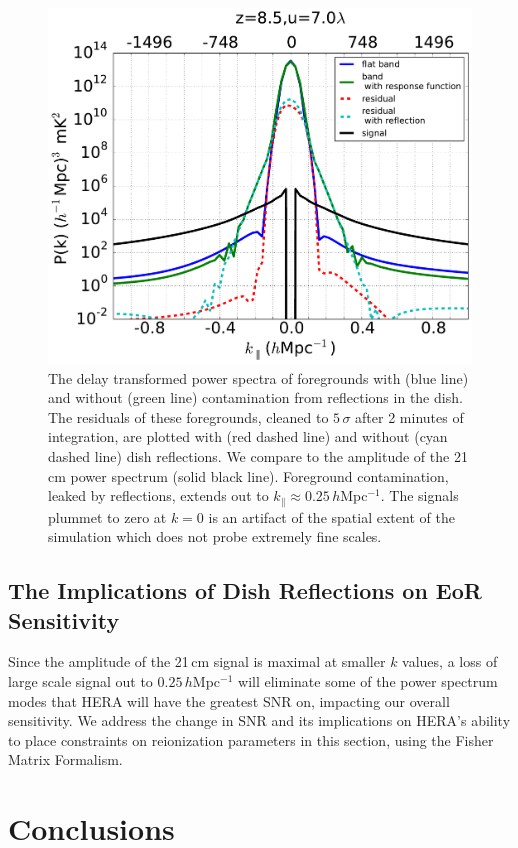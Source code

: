 \documentclass[twocolumn]{emulateapj}
\begin{document}
\begin{figure}
\centering
\includegraphics[width=.5\textwidth]{figures/resid_5sigma_compare.pdf}
\caption{The delay transformed power spectra of foregrounds with (blue line) and without (green line) contamination from reflections in the dish. The residuals of these foregrounds, cleaned to $5\,\sigma$ after 2 minutes of integration, are plotted with (red dashed line) and without (cyan dashed line) dish reflections. We compare to the amplitude of the 21\,cm power spectrum (solid black line). Foreground contamination, leaked by reflections, extends out to $k_\parallel \approx 0.25$\,$h$Mpc$^{-1}$. The signals plummet to zero at $k=0$ is an artifact of the spatial extent of the simulation which does not probe extremely fine scales.}
\label{fig:SignalCompare}
\end{figure}

\subsection{The Implications of Dish Reflections on EoR Sensitivity}
Since the amplitude of the 21\,cm signal is maximal at smaller $k$ values, a loss of large scale signal out to $0.25$\,$h$Mpc$^{-1}$ will eliminate some of the power spectrum modes that HERA will have the greatest SNR on, impacting our overall sensitivity. We address the change in SNR and its implications on HERA's ability to place constraints on reionization parameters in this section, using the Fisher Matrix Formalism. 

\section{Conclusions}
\label{sec:Conclusion}



\appendix
\end{document}
